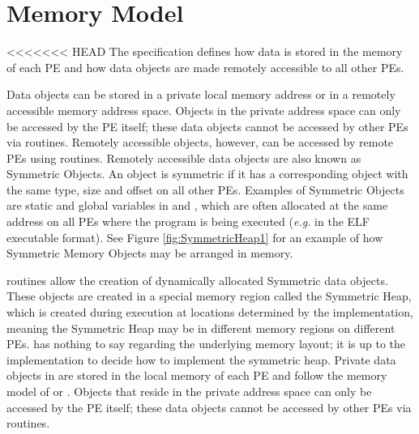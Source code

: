\section{Memory Model}

<<<<<<< HEAD
The \openshmem specification defines how data is stored in the memory
of each \ac{PE} and how data objects are made remotely accessible to all
other \ac{PE}s.

Data objects can be stored in a private local memory address or in
a remotely accessible memory address space. Objects in the private
address space can only be accessed by the \ac{PE} itself; these data objects
cannot be accessed by other \ac{PE}s via \openshmem routines. Remotely accessible
objects, however, can be accessed by remote \ac{PE}s using \openshmem routines.
Remotely accessible data objects are also known as Symmetric Objects.
An object is symmetric if it has a corresponding object with the same
type, size and offset on all other \ac{PE}s. Examples of Symmetric Objects
are static and global variables in \Clang{} and \Cpp, which are often allocated
at the same address on all \ac{PE}s where the program is being executed
(\emph{e.g.} in the ELF executable format). See Figure \ref{fig:SymmetricHeap1}
for an example of how Symmetric Memory Objects may be arranged in
memory.

\openshmem routines allow the creation of dynamically allocated Symmetric
data objects. These objects are created in a special memory region
called the Symmetric Heap, which is created during execution at locations
determined by the implementation, meaning the Symmetric Heap may be
in different memory regions on different \ac{PE}s. \openshmem has nothing
to say regarding the underlying memory layout; it is up to the implementation
to decide how to implement the symmetric heap. Private data objects in \openshmem are stored in the local memory of each \ac{PE} 
and follow the memory model of \Clang{} or \Fortran{}. Objects that reside in the private address space can only be accessed by the \ac{PE} itself; these data objects
cannot be accessed by other PEs via \openshmem routines. 



%

